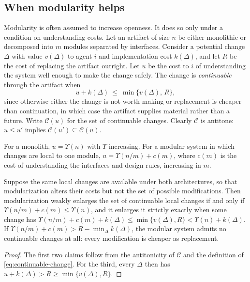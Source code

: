 \subsection{When modularity helps}

Modularity is often assumed to increase openness. It does so only under a condition on understanding costs. Let an artifact of size $n$ be either monolithic or decomposed into $m$ modules separated by interfaces. Consider a potential change $\Delta$ with value $v(\Delta)$ to agent $i$ and implementation cost $k(\Delta)$, and let $R$ be the cost of replacing the artifact outright. Let $u$ be the cost to $i$ of understanding the system well enough to make the change safely. The change is \emph{continuable} through the artifact when
\begin{equation}\label{eq:continuable-change}
u+k(\Delta)\ \leq\ \min\{v(\Delta),\,R\},
\end{equation}
since otherwise either the change is not worth making or replacement is cheaper than continuation, in which case the artifact supplies material rather than a future. Write $\mathcal{C}(u)$ for the set of continuable changes. Clearly $\mathcal{C}$ is antitone: $u\leq u'$ implies $\mathcal{C}(u')\subseteq\mathcal{C}(u)$.

For a monolith, $u=\Upsilon(n)$ with $\Upsilon$ increasing. For a modular system in which changes are local to one module, $u=\Upsilon(n/m)+c(m)$, where $c(m)$ is the cost of understanding the interfaces and design rules, increasing in $m$.

\begin{proposition}\label{prop:modularity}
Suppose the same local changes are available under both architectures, so that modularization alters their costs but not the set of possible modifications. Then modularization weakly enlarges the set of continuable local changes if and only if $\Upsilon(n/m)+c(m)\leq \Upsilon(n)$, and it enlarges it strictly exactly when some change has $\Upsilon(n/m)+c(m)+k(\Delta)\leq\min\{v(\Delta),R\}<\Upsilon(n)+k(\Delta)$. If $\Upsilon(n/m)+c(m)>R-\min_\Delta k(\Delta)$, the modular system admits no continuable changes at all: every modification is cheaper as replacement.
\end{proposition}

\begin{proof}
The first two claims follow from the antitonicity of $\mathcal{C}$ and the definition of \eqref{eq:continuable-change}. For the third, every $\Delta$ then has $u+k(\Delta)>R\geq\min\{v(\Delta),R\}$.
\end{proof}

